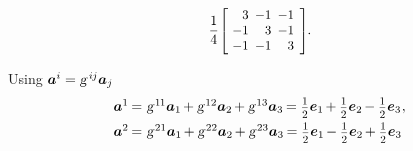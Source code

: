 \begin{otherlanguage}{russian}
\begin{tcolorbox}
\[\begin{array}{c}
\displaystyle \frac{1}{4} \hspace{.12ex}
\scalebox{0.92}[0.92]{$\left[\hspace{-0.4ex}\begin{array}{r@{\hspace{.5em}}r@{\hspace{.5em}}r}
3 & -1 & -1 \\
-1 & 3 & -1 \\
-1 & -1 & 3
\end{array}\hspace{-0.12ex}\right]^{\mathstrut}$} \hspace{-0.25ex}.
\end{array}\]

\vspace{-0.5em}Using ${\bm{a}^i = \textsl{g}^{\hspace{.32ex}i\hspace{-0.1ex}j} \bm{a}_j}$
\[\begin{array}{l}
\bm{a}^1 \hspace{-0.2ex}=\hspace{.1ex} \textsl{g}^{\hspace{.2ex}1\hspace{-0.1ex}1} \bm{a}_1 \hspace{-0.2ex} + \textsl{g}^{\hspace{.2ex}12} \bm{a}_2 \hspace{-0.2ex} + \textsl{g}^{\hspace{.2ex}13} \bm{a}_3 \hspace{-0.2ex} = \smalldisplaystyleonehalf \bm{e}_1 \hspace{-0.2ex} + \smalldisplaystyleonehalf \bm{e}_2 \hspace{-0.2ex} - \smalldisplaystyleonehalf \bm{e}_3
\hspace{.1ex} ,
\\[.5em]
%
\bm{a}^2 \hspace{-0.2ex}=\hspace{.1ex} \textsl{g}^{\hspace{.2ex}21} \bm{a}_1 \hspace{-0.2ex} + \textsl{g}^{\hspace{.2ex}22} \bm{a}_2 \hspace{-0.2ex} + \textsl{g}^{\hspace{.2ex}23} \bm{a}_3 \hspace{-0.2ex} = \smalldisplaystyleonehalf \bm{e}_1 \hspace{-0.2ex} - \smalldisplaystyleonehalf \bm{e}_2 \hspace{-0.2ex} + \smalldisplaystyleonehalf \bm{e}_3

\end{array}\]
\end{tcolorbox}
\end{otherlanguage}
